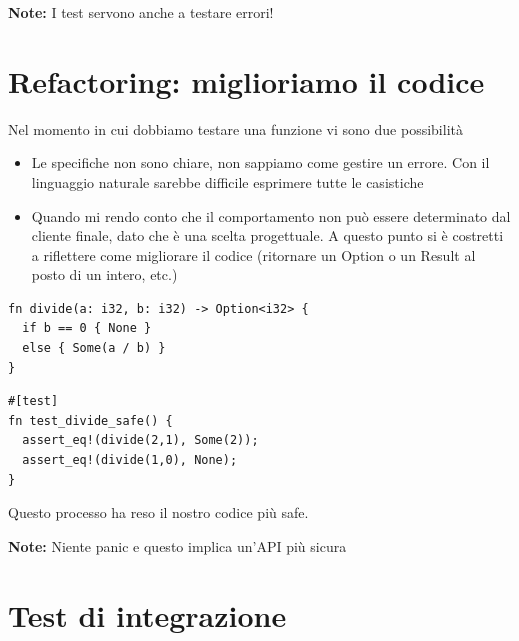 \begin{tcolorbox}
  \textbf{Note:} I test servono anche a testare errori!
\end{tcolorbox}

\section{Refactoring: miglioriamo il codice}

Nel momento in cui dobbiamo testare una funzione vi sono due possibilità

\begin{itemize}
  \item Le specifiche non sono chiare, non sappiamo come gestire un
        errore. Con il linguaggio naturale sarebbe difficile esprimere tutte le casistiche
  \item Quando mi rendo conto che il comportamento non può essere determinato
        dal cliente finale, dato che è una scelta progettuale.
        A questo punto si è costretti a riflettere come migliorare il codice (ritornare un Option o un Result al posto di un intero, etc.)
\end{itemize}

\begin{center}
  \begin{minipage}{0.45\linewidth}
    \begin{verbatim}
fn divide(a: i32, b: i32) -> Option<i32> {
  if b == 0 { None }
  else { Some(a / b) }
}
\end{verbatim}
  \end{minipage}%
  \hfill
  \begin{minipage}{0.45\linewidth}
    \begin{verbatim}
#[test]
fn test_divide_safe() {
  assert_eq!(divide(2,1), Some(2));
  assert_eq!(divide(1,0), None);
}
\end{verbatim}
  \end{minipage}
\end{center}



Questo processo ha reso il nostro codice più safe.

\begin{tcolorbox}
  \textbf{Note:} Niente panic e questo implica un'API più sicura
\end{tcolorbox}

\section{Test di integrazione}


